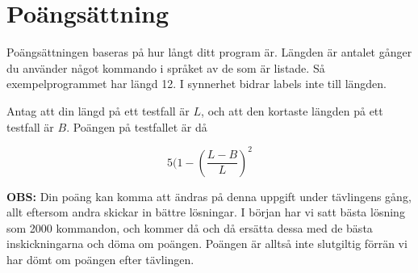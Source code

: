 \section*{Poängsättning}
Poängsättningen baseras på hur långt ditt program är. Längden är antalet gånger du använder något kommando i språket av de som är listade. Så exempelprogrammet har längd 12. I synnerhet bidrar labels inte till längden.

Antag att din längd på ett testfall är $L$, och att den kortaste längden på ett testfall är $B$. Poängen på testfallet är då

\[ 5 (1 - (\frac{L - B}{L})^2\]

\textbf{OBS:} Din poäng kan komma att ändras på denna uppgift under tävlingens gång, allt eftersom andra skickar in bättre lösningar. I början har vi satt bästa lösning som 2000 kommandon, och kommer då och då ersätta dessa
med de bästa inskickningarna och döma om poängen. Poängen är alltså inte slutgiltig förrän vi har dömt om poängen efter tävlingen.
